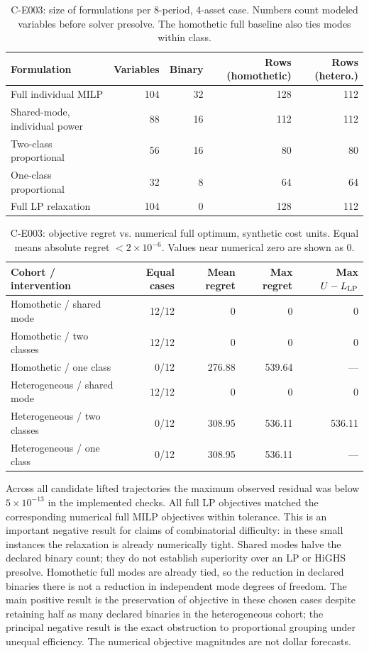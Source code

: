 \documentclass[11pt,letterpaper]{article}
\begin{document}
\begin{table}[htbp]
\small\centering
\caption{C-E003: size of formulations per 8-period, 4-asset case. Numbers count modeled variables before solver presolve. The homothetic full baseline also ties modes within class.}
\begin{tabular}{lrrrr}
\toprule
Formulation & Variables & Binary & Rows (homothetic) & Rows (hetero.)\\
\midrule
Full individual MILP &104&32&128&112\\
Shared-mode, individual power &88&16&112&112\\
Two-class proportional &56&16&80&80\\
One-class proportional &32&8&64&64\\
Full LP relaxation &104&0&128&112\\
\bottomrule
\end{tabular}
\end{table}
\begin{table}[htbp]
\small\centering
\caption{C-E003: objective regret vs. numerical full optimum, synthetic cost units. Equal means absolute regret $<2\times10^{-6}$. Values near numerical zero are shown as 0.}
\begin{tabularx}{\linewidth}{Yrrrr}
\toprule
Cohort / intervention & Equal cases & Mean regret & Max regret & Max $U-L_{\rm LP}$\\
\midrule
Homothetic / shared mode &12/12&0&0&0\\
Homothetic / two classes &12/12&0&0&0\\
Homothetic / one class &0/12&276.88&539.64&---\\
Heterogeneous / shared mode &12/12&0&0&0\\
Heterogeneous / two classes &0/12&308.95&536.11&536.11\\
Heterogeneous / one class &0/12&308.95&536.11&---\\
\bottomrule
\end{tabularx}
\end{table}
Across all candidate lifted trajectories the maximum observed residual was below $5\times10^{-13}$ in the implemented checks. All full LP objectives matched the corresponding numerical full MILP objectives within tolerance. This is an important negative result for claims of combinatorial difficulty: in these small instances the relaxation is already numerically tight. Shared modes halve the declared binary count; they do not establish superiority over an LP or HiGHS presolve. Homothetic full modes are already tied, so the reduction in declared binaries there is not a reduction in independent mode degrees of freedom. The main positive result is the preservation of objective in these chosen cases despite retaining half as many declared binaries in the heterogeneous cohort; the principal negative result is the exact obstruction to proportional grouping under unequal efficiency. The numerical objective magnitudes are not dollar forecasts.
\end{document}
